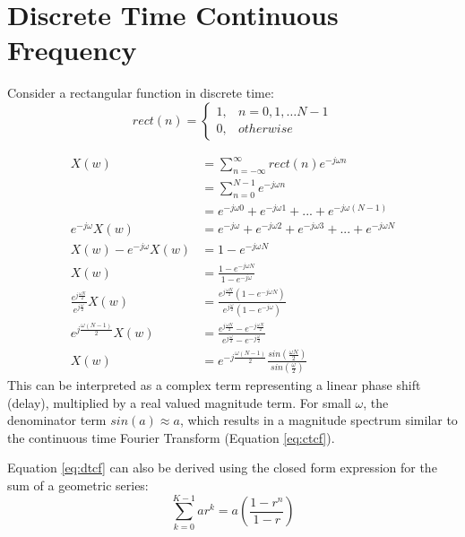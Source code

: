 \documentclass{article}
\begin{document}
\section{Discrete Time Continuous Frequency}

Consider a rectangular function in discrete time:
\begin{equation}
rect(n)= 
	\begin{cases}
      1, & n=0,1, \ldots N-1 \\
      0, & otherwise
	\end{cases}
\end{equation}

\begin{equation} \label{eq:dtcf}
\begin{split}
                     X(w) &= \sum_{n=-\infty}^{\infty} rect(n) e^{-j \omega n} \\
                          &= \sum_{n=0}^{N-1} e^{-j \omega n} \\
                          &= e^{-j \omega 0} + e^{-j \omega 1} + ... + e^{-j \omega (N-1)} \\
       e^{-j \omega} X(w) &= e^{-j \omega} + e^{-j \omega 2} + e^{-j \omega 3} + ... + e^{-j \omega N} \\
X(w) - e^{-j \omega} X(w) &= 1 - e^{-j \omega N} \\
                     X(w) &= \frac{1 - e^{-j \omega N}}{1 - e^{-j \omega}} \\
\frac{e^{j \frac{\omega N}{2}}}{e^{j \frac{\omega}{2}}} X(w) &= \frac{e^{j \frac{\omega N}{2}}(1 - e^{-j \omega N})}{e^{j \frac{\omega}{2}}(1 - e^{-j \omega})} \\
e^{j \frac{\omega (N-1)}{2}} X(w) &= \frac{e^{j \frac{\omega N}{2}} - e^{-j \frac{\omega N}{2}}}{e^{j \frac{\omega}{2}} - e^{-j \frac{\omega}{2}}} \\
X(w) &= e^{-j \frac{\omega (N-1)}{2}} \frac{sin(\frac{\omega N}{2})}{sin(\frac{\omega}{2})}
\end{split}
\end{equation}
This can be interpreted as a complex term representing a linear phase shift (delay), multiplied by a real valued magnitude term.  For small $\omega$, the denominator term $sin(a) \approx a$, which results in a magnitude spectrum similar to the continuous time Fourier Transform (Equation \ref{eq:ctcf}).

Equation \ref{eq:dtcf} can also be derived using the closed form expression for the sum of a geometric series:
\begin{equation} \label{eq_geosum}
\sum_{k=0}^{K-1} ar^k = a \left( \frac{1-r^n}{1-r} \right)
\end{equation}
\end{document}
